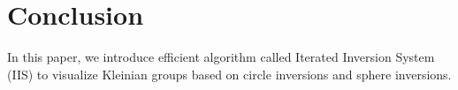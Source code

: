
\section{Conclusion}

In this paper, we introduce efficient algorithm 
called Iterated Inversion System (IIS) to visualize Kleinian
groups based on circle inversions and sphere inversions.

